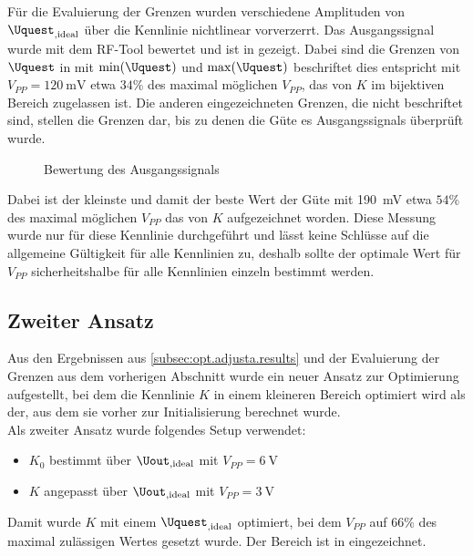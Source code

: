 \documentclass[../Report.tex]{subfiles}
\begin{document}
Für die Evaluierung der Grenzen wurden verschiedene Amplituden von $\Uquest_{,\textrm{ideal}}$ über die Kennlinie nichtlinear vorverzerrt. Das Ausgangssignal wurde mit dem RF-Tool \cite{RF-Tool} bewertet und ist in  gezeigt. Dabei sind die Grenzen von $\Uquest$ in  mit $\min(\Uquest)$ und $\max(\Uquest)$ beschriftet dies entspricht mit $V_{PP} = \SI{120}{\mV}$ etwa $34\%$ des maximal möglichen $V_{PP}$, das von $K$ im bijektiven Bereich zugelassen ist. Die anderen eingezeichneten Grenzen, die nicht beschriftet sind, stellen die Grenzen dar, bis zu denen die Güte es Ausgangssignals überprüft wurde.\\
\begin{figure}[H]
\begin{subfigure}{0.5 \textwidth}
	\setlength\figureheight{7.5cm}
	\setlength\figurewidth{7.5cm}
    	
	\label{fig:K0_quality}
\end{subfigure}
\begin{subfigure}{0.5 \textwidth}
	\setlength\figureheight{7.5cm}
	\setlength\figurewidth{7.5cm}
    	
	\label{fig:evaluateK.quality}
\end{subfigure}
\caption{Bewertung des Ausgangssignals}
\label{fig:evaluateK}
\end{figure}
Dabei ist der kleinste und damit der beste Wert der Güte mit \SI{190}{\mV} etwa $54\%$ des maximal möglichen $V_{PP}$ das von $K$ aufgezeichnet worden. Diese Messung wurde nur für diese Kennlinie durchgeführt und lässt keine Schlüsse auf die allgemeine Gültigkeit für alle Kennlinien zu, deshalb sollte der optimale Wert für $V_{PP}$ sicherheitshalbe für alle Kennlinien einzeln bestimmt werden.

\subsection{Zweiter Ansatz}
\label{subsubsec:opt.adjusta.kleiner}
Aus den Ergebnissen aus \ref{subsec:opt.adjusta.results} und der Evaluierung der Grenzen aus dem vorherigen Abschnitt wurde ein neuer Ansatz zur Optimierung aufgestellt, bei dem die Kennlinie $K$ in einem kleineren Bereich optimiert wird als der, aus dem sie vorher zur Initialisierung berechnet wurde.\\
Als zweiter Ansatz wurde folgendes Setup verwendet:
\begin{itemize}
	\item $K_0$ bestimmt über $\Uout_{,\textrm{ideal}}$ mit $V_{PP} = \SI{6}{\V}$
	\item $K$ angepasst über $\Uout_{,\textrm{ideal}}$ mit $V_{PP} = \SI{3}{\V}$
\end{itemize}
Damit wurde $K$ mit einem $\Uquest_{,\textrm{ideal}}$ optimiert, bei dem $V_{PP}$ auf $66\%$ des maximal zulässigen Wertes gesetzt wurde. Der Bereich ist in  eingezeichnet.
\end{document}
